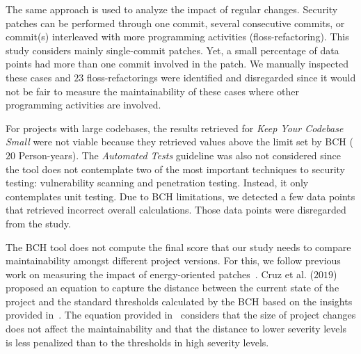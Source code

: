 \documentclass[smallextended]{svjour3}       %
\begin{document}
The same approach is used to analyze the impact of regular 
changes. Security patches can be performed through one commit, 
several consecutive commits, or commit(s) interleaved with more 
programming activities (floss-refactoring). This study considers 
mainly single-commit patches. Yet, a small percentage of data points 
had more than one commit involved in the patch. We manually 
inspected these cases and $23$ floss-refactorings were identified 
and disregarded since it would not be fair to measure the 
maintainability of these cases where other programming activities 
are involved.

For projects with large codebases, the results retrieved for 
\emph{Keep Your Codebase Small} were not viable because they 
retrieved values above the limit set by BCH ($20$ Person-years). The 
\emph{Automated Tests} guideline was also not considered since the 
tool does not contemplate two of the most important techniques to 
security testing: vulnerability scanning and penetration testing. 
Instead, it only contemplates unit testing. Due to BCH limitations, 
we detected a few data points that retrieved incorrect overall 
calculations. Those data points were disregarded from the study.

The BCH tool does not compute the final score that our study needs 
to compare maintainability amongst different project versions. For 
this, we follow previous work on measuring the impact of 
energy-oriented patches~\cite{8919169}. Cruz et al. ($2019$) 
proposed an equation to capture the distance between the current 
state of the project and the standard thresholds calculated by the 
BCH based on the insights provided in~\cite{Olivari:2018}. The 
equation provided in~\cite{8919169} considers that the size of 
project changes does not affect the maintainability and that the 
distance to lower severity levels is less penalized than to the
thresholds in high severity levels.

\end{document}
